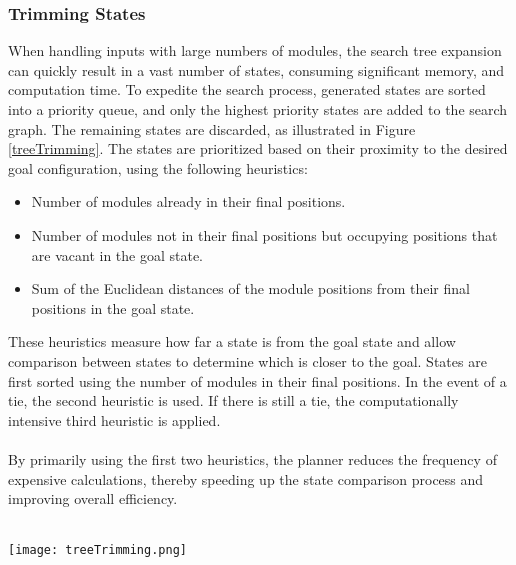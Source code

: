 \subsubsection{Trimming States}\label{statePriority}
When handling inputs with large numbers of modules, the search tree expansion can quickly result in a vast number of states, consuming significant memory, and computation time. To expedite the search process, generated states are sorted into a priority queue, and only the highest priority states are added to the search graph. The remaining states are discarded, as illustrated in Figure \ref{treeTrimming}. The states are prioritized based on their proximity to the desired goal configuration, using the following heuristics:
\begin{itemize}[]
	\item Number of modules already in their final positions.
	\item Number of modules not in their final positions but occupying positions that are vacant in the goal state.
	\item Sum of the Euclidean distances of the module positions from their final positions in the goal state.
\end{itemize}
These heuristics measure how far a state is from the goal state and allow comparison between states to determine which is closer to the goal. States are first sorted using the number of modules in their final positions. In the event of a tie, the second heuristic is used. If there is still a tie, the computationally intensive third heuristic is applied.
\\\\
By primarily using the first two heuristics, the planner reduces the frequency of expensive calculations, thereby speeding up the state comparison process and improving overall efficiency.
\\\\
\begin{figure*}[h]
	\centering
	\texttt{[image: treeTrimming.png]}
	\caption{Selection of generated states demonstration}
	\label{treeTrimming}
\end{figure*}

